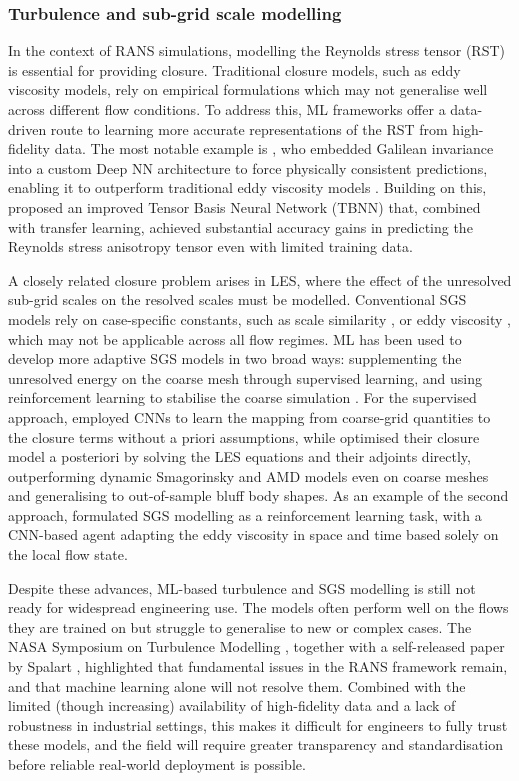 \subsubsection{Turbulence and sub-grid scale modelling}
In the context of RANS simulations, modelling the Reynolds stress tensor (RST) is essential for providing closure. Traditional closure models, such as eddy viscosity models, rely on empirical formulations which may not generalise well across different flow conditions. To address this, ML frameworks offer a data-driven route to learning more accurate representations of the RST from high-fidelity data. The most notable example is \textcite{Ling2016}, who embedded Galilean invariance into a custom Deep NN architecture to force physically consistent predictions, enabling it to outperform traditional eddy viscosity models \cite{Vinuesa2022}. Building on this, \textcite{Cai2024} proposed an improved Tensor Basis Neural Network (TBNN) that, combined with transfer learning, achieved substantial accuracy gains in predicting the Reynolds stress anisotropy tensor even with limited training data.

A closely related closure problem arises in LES, where the effect of the unresolved sub-grid scales on the resolved scales must be modelled. Conventional SGS models rely on case-specific constants, such as scale similarity \cite{Bardina1980}, or eddy viscosity \cite{Lilly1992, Germano1991}, which may not be applicable across all flow regimes. ML has been used to develop more adaptive SGS models in two broad ways: supplementing the unresolved energy on the coarse mesh through supervised learning, and using reinforcement learning to stabilise the coarse simulation \cite{Vinuesa2022}. For the supervised approach, \textcite{Beck2019} employed CNNs to learn the mapping from coarse-grid quantities to the closure terms without a priori assumptions, while \textcite{Sirignano2023} optimised their closure model a posteriori by solving the LES equations and their adjoints directly, outperforming dynamic Smagorinsky and AMD \cite{Rozema2015} models even on coarse meshes and generalising to out-of-sample bluff body shapes. As an example of the second approach, \textcite{Kurz2023} formulated SGS modelling as a reinforcement learning task, with a CNN-based agent adapting the eddy viscosity in space and time based solely on the local flow state.

Despite these advances, ML-based turbulence and SGS modelling is still not ready for widespread engineering use. The models often perform well on the flows they are trained on but struggle to generalise to new or complex cases. The NASA Symposium on Turbulence Modelling \cite{Rumsey2022}, together with a self-released paper by Spalart \cite{Spalart}, highlighted that fundamental issues in the RANS framework remain, and that machine learning alone will not resolve them. Combined with the limited (though increasing) availability of high-fidelity data and a lack of robustness in industrial settings, this makes it difficult for engineers to fully trust these models, and the field will require greater transparency and standardisation before reliable real-world deployment is possible.


